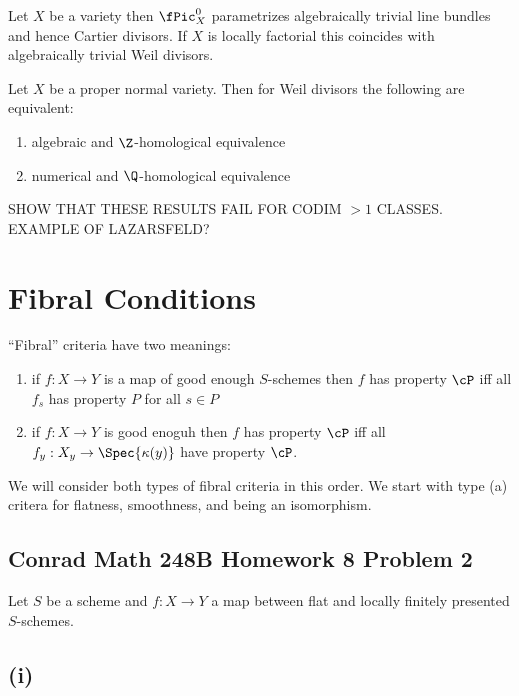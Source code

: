 \documentclass[12pt]{article}
\begin{document}
\begin{defn}

\end{defn}

\begin{prop}
Let $X$ be a variety then $\fPic^0_X$ parametrizes algebraically trivial line bundles and hence Cartier divisors. If $X$ is locally factorial this coincides with algebraically trivial Weil divisors.
\end{prop}

\begin{prop}
Let $X$ be a proper normal variety. Then for Weil divisors the following are equivalent:
\begin{enumerate}
\item algebraic and $\Z$-homological equivalence
\item numerical and $\Q$-homological equivalence
\end{enumerate}
\end{prop}

SHOW THAT THESE RESULTS FAIL FOR CODIM $>1$ CLASSES. EXAMPLE OF LAZARSFELD?

\section{Fibral Conditions}

``Fibral'' criteria have two meanings:
\begin{enumerate}
\item if $f : X \to Y$ is a map of good enough $S$-schemes then $f$ has property $\cP$ iff all $f_s$ has property $P$ for all $s \in P$
\item if $f : X \to Y$ is good enoguh then $f$ has property $\cP$ iff all $f_y : X_y \to \Spec{\kappa(y)}$ have property $\cP$.
\end{enumerate}
We will consider both types of fibral criteria in this order. We start with type (a) critera for flatness, smoothness, and being an isomorphism.

\subsection{Conrad Math 248B Homework 8 Problem 2}

Let $S$ be a scheme and $f : X \to Y$ a map between flat and locally finitely  presented $S$-schemes.

\subsection{(i)}
\end{document}
